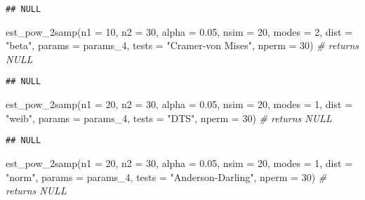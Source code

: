 \documentclass[
]{article}
\newenvironment{Shaded}{\begin{snugshade}}{\end{snugshade}}
\newcommand{\AttributeTok}[1]{\textcolor[rgb]{0.77,0.63,0.00}{#1}}
\newcommand{\CommentTok}[1]{\textcolor[rgb]{0.56,0.35,0.01}{\textit{#1}}}
\newcommand{\DecValTok}[1]{\textcolor[rgb]{0.00,0.00,0.81}{#1}}
\newcommand{\FloatTok}[1]{\textcolor[rgb]{0.00,0.00,0.81}{#1}}
\newcommand{\FunctionTok}[1]{\textcolor[rgb]{0.00,0.00,0.00}{#1}}
\newcommand{\NormalTok}[1]{#1}
\newcommand{\StringTok}[1]{\textcolor[rgb]{0.31,0.60,0.02}{#1}}
\begin{document}
\begin{verbatim}
## NULL
\end{verbatim}

\begin{Shaded}
\begin{Highlighting}[]
\FunctionTok{est\_pow\_2samp}\NormalTok{(}\AttributeTok{n1 =} \DecValTok{10}\NormalTok{, }\AttributeTok{n2 =} \DecValTok{30}\NormalTok{, }\AttributeTok{alpha =} \FloatTok{0.05}\NormalTok{, }\AttributeTok{nsim =} \DecValTok{20}\NormalTok{, }\AttributeTok{modes =} \DecValTok{2}\NormalTok{, }\AttributeTok{dist =} \StringTok{"beta"}\NormalTok{, }\AttributeTok{params =}\NormalTok{ params\_4, }\AttributeTok{tests =} \StringTok{"Cramer{-}von Mises"}\NormalTok{, }\AttributeTok{nperm =} \DecValTok{30}\NormalTok{)     }\CommentTok{\# returns NULL}
\end{Highlighting}
\end{Shaded}

\begin{verbatim}
## NULL
\end{verbatim}

\begin{Shaded}
\begin{Highlighting}[]
\FunctionTok{est\_pow\_2samp}\NormalTok{(}\AttributeTok{n1 =} \DecValTok{20}\NormalTok{, }\AttributeTok{n2 =} \DecValTok{30}\NormalTok{, }\AttributeTok{alpha =} \FloatTok{0.05}\NormalTok{, }\AttributeTok{nsim =} \DecValTok{20}\NormalTok{, }\AttributeTok{modes =} \DecValTok{1}\NormalTok{, }\AttributeTok{dist =} \StringTok{"weib"}\NormalTok{, }\AttributeTok{params =}\NormalTok{ params\_4, }\AttributeTok{tests =} \StringTok{"DTS"}\NormalTok{, }\AttributeTok{nperm =} \DecValTok{30}\NormalTok{)                  }\CommentTok{\# returns NULL}
\end{Highlighting}
\end{Shaded}

\begin{verbatim}
## NULL
\end{verbatim}

\begin{Shaded}
\begin{Highlighting}[]
\FunctionTok{est\_pow\_2samp}\NormalTok{(}\AttributeTok{n1 =} \DecValTok{20}\NormalTok{, }\AttributeTok{n2 =} \DecValTok{30}\NormalTok{, }\AttributeTok{alpha =} \FloatTok{0.05}\NormalTok{, }\AttributeTok{nsim =} \DecValTok{20}\NormalTok{, }\AttributeTok{modes =} \DecValTok{1}\NormalTok{, }\AttributeTok{dist =} \StringTok{"norm"}\NormalTok{, }\AttributeTok{params =}\NormalTok{ params\_4, }\AttributeTok{tests =} \StringTok{"Anderson{-}Darling"}\NormalTok{, }\AttributeTok{nperm =} \DecValTok{30}\NormalTok{)     }\CommentTok{\# returns NULL}
\end{Highlighting}
\end{Shaded}
\end{document}
